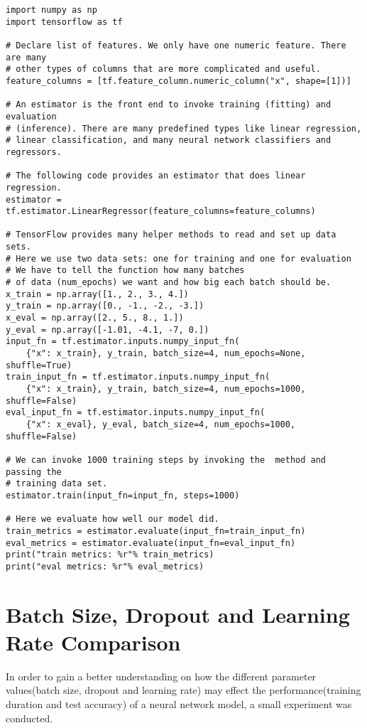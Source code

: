 \begin{adjustbox}{width=\textwidth}
\begin{lstlisting}
import numpy as np
import tensorflow as tf

# Declare list of features. We only have one numeric feature. There are many
# other types of columns that are more complicated and useful.
feature_columns = [tf.feature_column.numeric_column("x", shape=[1])]

# An estimator is the front end to invoke training (fitting) and evaluation
# (inference). There are many predefined types like linear regression,
# linear classification, and many neural network classifiers and regressors.

# The following code provides an estimator that does linear regression.
estimator = tf.estimator.LinearRegressor(feature_columns=feature_columns)

# TensorFlow provides many helper methods to read and set up data sets.
# Here we use two data sets: one for training and one for evaluation
# We have to tell the function how many batches
# of data (num_epochs) we want and how big each batch should be.
x_train = np.array([1., 2., 3., 4.])
y_train = np.array([0., -1., -2., -3.])
x_eval = np.array([2., 5., 8., 1.])
y_eval = np.array([-1.01, -4.1, -7, 0.])
input_fn = tf.estimator.inputs.numpy_input_fn(
    {"x": x_train}, y_train, batch_size=4, num_epochs=None, shuffle=True)
train_input_fn = tf.estimator.inputs.numpy_input_fn(
    {"x": x_train}, y_train, batch_size=4, num_epochs=1000, shuffle=False)
eval_input_fn = tf.estimator.inputs.numpy_input_fn(
    {"x": x_eval}, y_eval, batch_size=4, num_epochs=1000, shuffle=False)

# We can invoke 1000 training steps by invoking the  method and passing the
# training data set.
estimator.train(input_fn=input_fn, steps=1000)

# Here we evaluate how well our model did.
train_metrics = estimator.evaluate(input_fn=train_input_fn)
eval_metrics = estimator.evaluate(input_fn=eval_input_fn)
print("train metrics: %r"% train_metrics)
print("eval metrics: %r"% eval_metrics)
\end{lstlisting}
\end{adjustbox}

\section{Batch Size, Dropout and Learning Rate Comparison}
In order to gain a better understanding on how the different parameter values(batch size, dropout and learning rate) may effect the performance(training duration and test accuracy) of a neural network model, a small experiment was conducted.

